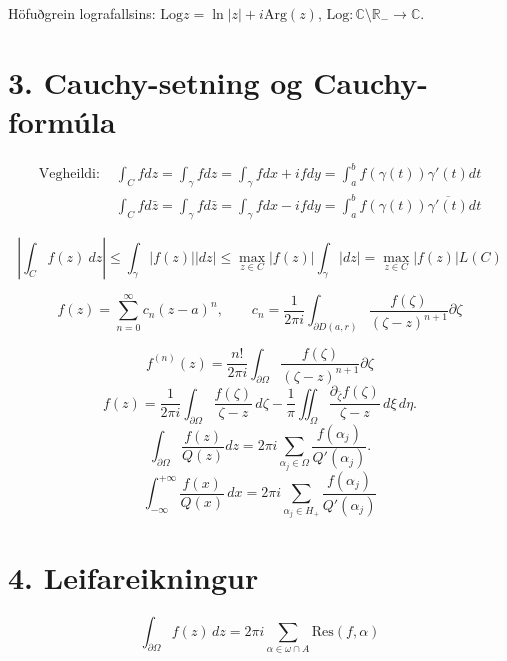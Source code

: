 \medskip

\noindent Höfuðgrein lografallsins:
$\displaystyle \text{Log} z 
= \ln |z| + i \text{Arg}(z)$, $\text{Log}: \mathbb{C} \setminus 
\mathbb{R_{-}} \to \mathbb{C}$.



\section*{3. Cauchy-setning og Cauchy-formúla}

\begin{minipage}{1\linewidth}
\begin{align*} \text{Vegheildi: }
&\int_C f dz = \int _{\gamma} fdz =\int_{\gamma}fdx+ ifdy = \int_{a}^{b} f(\gamma(t)) \gamma'(t)dt \\
&\int_C f d\bar{z} = \int _{\gamma} fd\bar{z} =\int_{\gamma}fdx - ifdy = \int_{a}^{b} f(\gamma(t)) \overline{\gamma'(t)}dt
\end{align*}
\end{minipage}

\bigskip

\[\left|\int_C f(z)\ dz\right|\leq\int_\gamma \left|f(z)\right|\left|dz\right|\leq\max_{z\in C}\left|f(z)\right|\int_\gamma \left|dz\right|=\max_{z\in C}\left|f(z)\right|L(C)\]

\bigskip

\begin{equation*}	
		f(z) = \sum_{n=0}^{\infty} c_n(z-a) ^ {n}, \qquad c_n = 
\frac{1}{2\pi i} \int_{\partial D(a,r)} \frac{f(\zeta)}{(\zeta - z) ^ {n+1}} \partial \zeta
\end{equation*}


\bigskip

\[
f ^ {(n)} (z) = \frac{n!}{2\pi i} \int_{\partial \Omega} \frac{f(\zeta)}{(\zeta - z) ^ {n+1}} \partial \zeta
\]
\bigskip
\[
f(z) = \frac{1}{2\pi i} \int_{\partial\Omega} \frac{f(\zeta)}{\zeta - z}\, d\zeta
- \frac{1}{\pi} \iint_{\Omega} \frac{\partial_{\bar{\zeta}} f(\zeta)}{\zeta - z}\, d\xi\, d\eta .
\]
\bigskip
\[
\int_{\partial \Omega} \frac{f(z)}{Q(z)}dz
    = 2\pi i \sum_{\alpha_j \in \Omega} \frac{f(\alpha_j)}{Q'(\alpha_j)}.
\]
\bigskip
\[
\int_{-\infty}^{+\infty} \frac{f(x)}{Q(x)}\, dx
    = 2\pi i \sum_{\alpha_j \in H_+} \frac{f(\alpha_j)}{Q'(\alpha_j)}
\]

\bigskip
\section*{4. Leifareikningur}
\[
		\int_{\partial \Omega} f(z)\,dz = 2 \pi i \sum_{\alpha \in \omega \cap A} \text{Res} (f, \alpha)
\]

